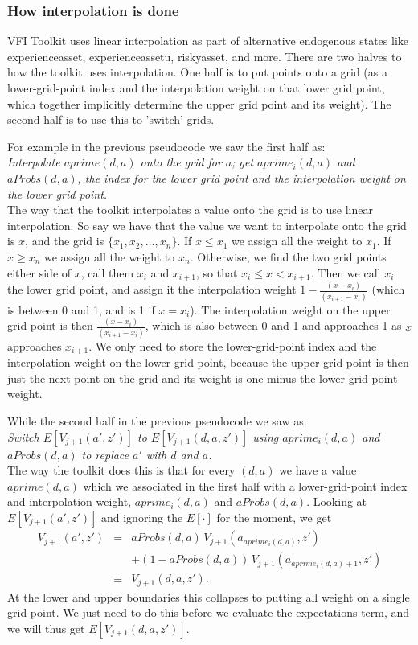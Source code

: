 \subsubsection{How interpolation is done}\label{sec:interp}
VFI Toolkit uses linear interpolation as part of alternative endogenous states like experienceasset, experienceassetu, riskyasset, and more. There are two halves to how the toolkit uses interpolation. One half is to put points onto a grid (as a lower-grid-point index and the interpolation weight on that lower grid point, which together implicitly determine the upper grid point and its weight). The second half is to use this to 'switch' grids.

For example in the previous pseudocode we saw the first half as: \\
\textit{Interpolate $aprime(d,a)$ onto the grid for $a$; get $aprime_i(d,a)$ and $aProbs(d,a)$, the index for the lower grid point and the interpolation weight on the lower grid point.}
\\ The way that the toolkit interpolates a value onto the grid is to use linear interpolation. So say we have that the value we want to interpolate onto the grid is $x$, and the grid is $\{x_1,x_2,\dots,x_n\}$. If $x\leq x_1$ we assign all the weight to $x_1$. If $x\geq x_n$ we assign all the weight to $x_n$. Otherwise, we find the two grid points either side of $x$, call them $x_i$ and $x_{i+1}$, so that $x_i\leq x < x_{i+1}$. Then we call $x_i$ the lower grid point, and assign it the interpolation weight $1-\frac{(x-x_i)}{(x_{i+1}-x_i)}$ (which is between 0 and 1, and is 1 if $x=x_i$). The interpolation weight on the upper grid point is then $\frac{(x-x_i)}{(x_{i+1}-x_i)}$, which is also between 0 and 1 and approaches 1 as $x$ approaches $x_{i+1}$. We only need to store the lower-grid-point index and the interpolation weight on the lower grid point, because the upper grid point is then just the next point on the grid and its weight is one minus the lower-grid-point weight.

While the second half in the previous pseudocode we saw as: \\
\textit{Switch $E[V_{j+1}(a',z')]$ to $E[V_{j+1}(d,a,z')]$ using $aprime_i(d,a)$ and $aProbs(d,a)$ to replace $a'$ with $d$ and $a$.}
\\ The way the toolkit does this is that for every $(d,a)$ we have a value $aprime(d,a)$ which we associated in the first half with a lower-grid-point index and interpolation weight, $aprime_i(d,a)$ and $aProbs(d,a)$. Looking at $E[V_{j+1}(a',z')]$ and ignoring the $E[\cdot]$ for the moment, we get
\begin{eqnarray*}
V_{j+1}(a',z') &=& aProbs(d,a)\,V_{j+1}(a_{aprime_i(d,a)},z') \\
&& + (1-aProbs(d,a))\,V_{j+1}(a_{aprime_i(d,a)+1},z') \\
&\equiv& V_{j+1}(d,a,z').
\end{eqnarray*}
At the lower and upper boundaries this collapses to putting all weight on a single grid point. We just need to do this before we evaluate the expectations term, and we will thus get $E[V_{j+1}(d,a,z')]$.

